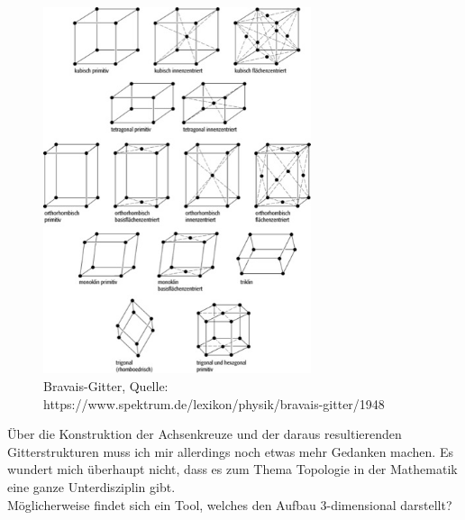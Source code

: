 \begin{figure}[H]
    \centering
    \includegraphics[width=0.7\textwidth]{entries/1/bravais.jpg}
    \caption{Bravais-Gitter, Quelle: https://www.spektrum.de/lexikon/physik/bravais-gitter/1948}
\end{figure}

Über die Konstruktion der Achsenkreuze und der daraus resultierenden Gitterstrukturen muss ich mir allerdings noch etwas mehr Gedanken machen. 
Es wundert mich überhaupt nicht, dass es zum Thema Topologie in der Mathematik eine ganze Unterdisziplin gibt.\\
Möglicherweise findet sich ein Tool, welches den Aufbau 3-dimensional darstellt?